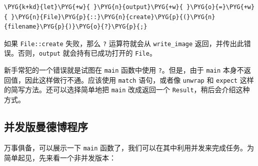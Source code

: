\begin{Verbatim}[commandchars=\\\{\},breaklines=true,breakanywhere=true,fontsize=\codefont,xleftmargin=17bp]
\PYG{k+kd}{let}\PYG{+w}{ }\PYG{n}{output}\PYG{+w}{ }\PYG{o}{=}\PYG{+w}{ }\PYG{n}{File}\PYG{p}{::}\PYG{n}{create}\PYG{p}{(}\PYG{n}{filename}\PYG{p}{)}\PYG{o}{?}\PYG{p}{;}
\end{Verbatim}

如果 \texttt{File::create} 失败，那么 \texttt{?} 运算符就会从 \texttt{write\_image} 返回，并传出此错误。否则，\texttt{output} 就会持有已成功打开的 \texttt{File}。

\begin{myNote}
新手常犯的一个错误就是试图在 \texttt{main} 函数中使用 \texttt{?}。但是，由于 \texttt{main} 本身不返回值，因此这样做行不通。应该使用 \texttt{match} 语句，或者像 \texttt{unwrap} 和 \texttt{expect} 这样的简写方法。还可以选择简单地把 \texttt{main} 改成返回一个 \texttt{Result}，稍后会介绍这种方式。
\end{myNote}

\subsection{并发版曼德博程序}

万事俱备，可以展示一下 \texttt{main} 函数了，我们可以在其中利用并发来完成任务。为简单起见，先来看一个非并发版本：

